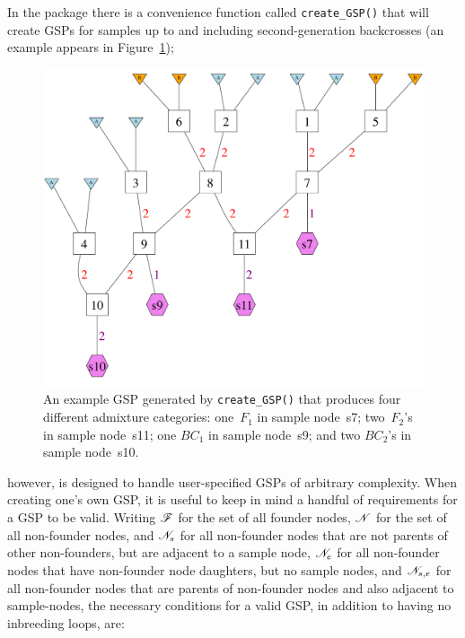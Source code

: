 In the \gscramble{} package there is a convenience function called {\footnotesize\tt create\_GSP()} that
will create GSPs for samples up to and including second-generation backcrosses (an example appears in Figure~\ref{fig:gsp2}); 
\begin{figure}
\newcommand{\gspcaptwo}{\footnotesize
An example GSP generated by {\footnotesize\tt create\_GSP()} that produces four different
admixture categories: one~$F_1$ in sample node~s7; two~$F_2$'s in sample node~s11; one $BC_1$ in sample node~s9; and two $BC_2$'s in sample node~s10. 
}
\begin{center}
\includegraphics[width=\columnwidth]{figures/AllThem.pdf}
\end{center}
\caption[\gspcaptwo]{\gspcaptwo}
\label{fig:gsp2}
\end{figure}
however, \gscramble{} is designed
to handle user-specified GSPs of arbitrary complexity.  When creating one's own GSP, it is useful
to keep in mind a handful of requirements for a GSP to be valid. Writing $\mathscr{F}$ for the set of all founder nodes, $\mathscr{N}$ for the set of all non-founder nodes, and $\mathscr{N}_s$ for all non-founder
nodes that are not parents of other non-founders, but are adjacent to a sample node, $\mathscr{N}_e$ for all
non-founder nodes that have non-founder node daughters, but no sample nodes, and $\mathscr{N}_{s,e}$ for all
non-founder nodes that are parents of non-founder nodes and also adjacent to sample-nodes, the necessary conditions
for a valid GSP, in addition to having no inbreeding loops, are:
